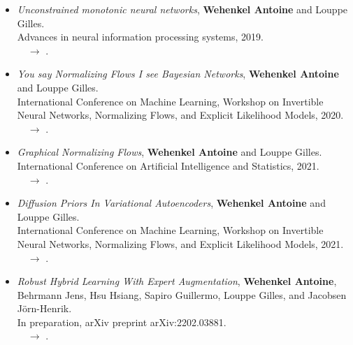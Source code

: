\begin{itemize}
\item[] \citep{wehenkel_unconstrained_2019} \textit{Unconstrained monotonic neural networks},
\textbf{Wehenkel Antoine} and Louppe Gilles.\\
Advances in neural information processing systems, 2019.\\
$\quad \rightarrow$ .

\item[] \citep{wehenkel_you_2020} \textit{You say Normalizing Flows I see Bayesian Networks},
\textbf{Wehenkel Antoine} and Louppe Gilles.\\
International Conference on Machine Learning, Workshop on Invertible Neural Networks, Normalizing Flows, and Explicit Likelihood Models, 2020.\\
$\quad \rightarrow$ .

\item[] \citep{wehenkel2021graphical} \textit{Graphical Normalizing Flows},
\textbf{Wehenkel Antoine} and Louppe Gilles.\\
International Conference on Artificial Intelligence and Statistics, 2021.\\
$\quad \rightarrow$ .

\item[] \citep{wehenkel2021diffusion} \textit{Diffusion Priors In Variational Autoencoders},
\textbf{Wehenkel Antoine} and Louppe Gilles.\\
International Conference on Machine Learning, Workshop on Invertible Neural Networks, Normalizing Flows, and Explicit Likelihood Models, 2021.\\
$\quad \rightarrow$ .

\item[] \citep{wehenkel2022robust} \textit{Robust Hybrid Learning With Expert Augmentation},
\textbf{Wehenkel Antoine}, Behrmann Jens, Hsu Hsiang, Sapiro Guillermo, Louppe Gilles, and Jacobsen J{\"o}rn-Henrik.\\
In preparation, arXiv preprint arXiv:2202.03881.\\
$\quad \rightarrow$ .

\end{itemize}


